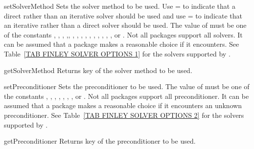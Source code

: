 \begin{methoddesc}[SolverOptions]{setSolverMethod}{}
Sets the solver method to be used. Use = to indicate that a direct rather than an iterative solver should be used and use = to indicate that an iterative rather than a direct solver should be used. 
The value of  must be one of the constants
 , , , ,, , , , 
 , , , ,  , , , 
 or .
Not all packages support all solvers. It can be assumed that a package makes a reasonable choice if it encounters. See Table~\ref{TAB FINLEY SOLVER OPTIONS 1} for the solvers supported by \finley.
\end{methoddesc}

\begin{methoddesc}[SolverOptions]{getSolverMethod}{}
Returns key of the solver method to be used. 
\end{methoddesc}

\begin{methoddesc}[SolverOptions]{setPreconditioner}{}
Sets the preconditioner to be used. 
The value of  must be one of the constants
, , , 
, , , , or
.
Not all packages support all preconditioner. It can be assumed that a package makes a reasonable choice if it encounters
an unknown preconditioner. See Table~\ref{TAB FINLEY SOLVER OPTIONS 2} for the solvers supported by \finley.
\end{methoddesc}
   
\begin{methoddesc}[SolverOptions]{getPreconditioner}{}
Returns key of the preconditioner to be used. 
\end{methoddesc}

